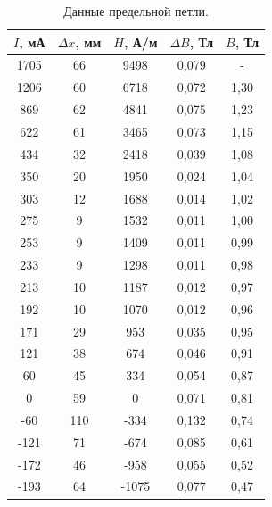 \documentclass[a4paper,12pt]{article} %
\begin{document}
	
	\begin{longtable}[c]{|c|c|c|c|c|}
		\caption[lot]{Данные предельной петли.}
		\label{table:limit}\\
		\hline
		$I$, мА & $\Delta x$, мм & $H$, А/м & $\Delta B$, Тл & $B$, Тл \\ \hline
		1705    & 66             & 9498     & 0,079          & -       \\ \hline
		1206    & 60             & 6718     & 0,072          & 1,30    \\ \hline
		869     & 62             & 4841     & 0,075          & 1,23    \\ \hline
		622     & 61             & 3465     & 0,073          & 1,15    \\ \hline
		434     & 32             & 2418     & 0,039          & 1,08    \\ \hline
		350     & 20             & 1950     & 0,024          & 1,04    \\ \hline
		303     & 12             & 1688     & 0,014          & 1,02    \\ \hline
		275     & 9              & 1532     & 0,011          & 1,00    \\ \hline
		253     & 9              & 1409     & 0,011          & 0,99    \\ \hline
		233     & 9              & 1298     & 0,011          & 0,98    \\ \hline
		213     & 10             & 1187     & 0,012          & 0,97    \\ \hline
		192     & 10             & 1070     & 0,012          & 0,96    \\ \hline
		171     & 29             & 953      & 0,035          & 0,95    \\ \hline
		121     & 38             & 674      & 0,046          & 0,91    \\ \hline
		60      & 45             & 334      & 0,054          & 0,87    \\ \hline
		0       & 59             & 0        & 0,071          & 0,81    \\ \hline
		-60     & 110            & -334     & 0,132          & 0,74    \\ \hline
		-121    & 71             & -674     & 0,085          & 0,61    \\ \hline
		-172    & 46             & -958     & 0,055          & 0,52    \\ \hline
		-193    & 64             & -1075    & 0,077          & 0,47    \\ \hline

\end{longtable}
\end{document}
